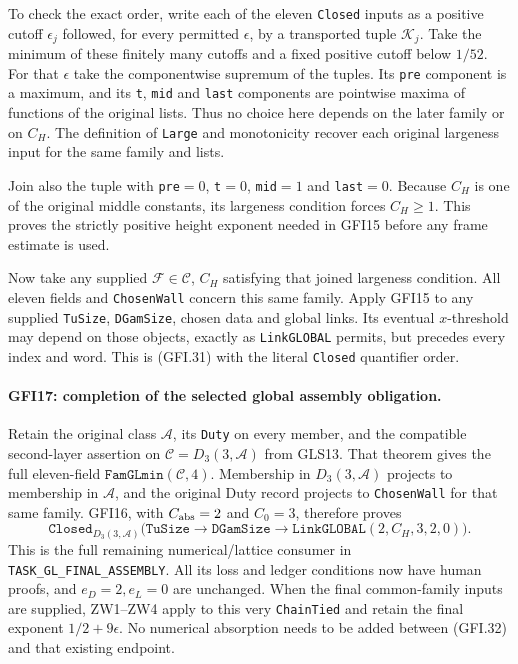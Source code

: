 To check the exact order, write each of the eleven \texttt{Closed}
inputs as a positive cutoff $\epsilon_j$ followed, for every
permitted $\epsilon$, by a transported tuple $\mathcal K_j$.
Take the minimum of these finitely many cutoffs and a fixed
positive cutoff below $1/52$.  For that $\epsilon$ take the
componentwise supremum of the tuples.  Its \texttt{pre} component
is a maximum, and its \texttt{t}, \texttt{mid} and \texttt{last}
components are pointwise maxima of functions of the original lists.
Thus no choice here depends on the later family or on $C_H$.
The definition of \texttt{Large} and monotonicity recover each
original largeness input for the same family and lists.

Join also the tuple with \texttt{pre}$=0$, \texttt{t}$=0$,
\texttt{mid}$=1$ and \texttt{last}$=0$.  Because $C_H$ is one
of the original middle constants, its largeness condition forces
$C_H\ge1$.  This proves the strictly positive height exponent
needed in GFI15 before any frame estimate is used.

Now take any supplied $\mathcal F\in\mathcal C$, $C_H$ satisfying
that joined largeness condition.  All eleven fields and
\texttt{ChosenWall} concern this same family.  Apply GFI15 to
any supplied \texttt{TuSize}, \texttt{DGamSize}, chosen data and
global links.  Its eventual $x$-threshold may depend on those
objects, exactly as \texttt{LinkGLOBAL} permits, but precedes
every index and word.  This is (GFI.31) with the literal
\texttt{Closed} quantifier order.

\paragraph{GFI17: completion of the selected global assembly obligation.}
\label{claim:GFI17}
Retain the original class $\mathcal A$, its \texttt{Duty} on every
member, and the compatible second-layer assertion on
$\mathcal C=D_3(3,\mathcal A)$ from GLS13.  That theorem gives
the full eleven-field $\texttt{FamGLmin}(\mathcal C,4)$.
Membership in $D_3(3,\mathcal A)$ projects to membership in
$\mathcal A$, and the original Duty record projects to
\texttt{ChosenWall} for that same family.  GFI16, with
$C_{\rm abs}=2$ and $C_0=3$, therefore proves
\[
 \boxed{\quad
 \texttt{Closed}_{D_3(3,\mathcal A)}
  \bigl(\texttt{TuSize}\to\texttt{DGamSize}\to
          \texttt{LinkGLOBAL}(2,C_H,3,2,0)\bigr).
 \quad}                                                   \tag{GFI.32}
\]
This is the full remaining numerical/lattice consumer in
\texttt{TASK\_GL\_FINAL\_ASSEMBLY}.  All its loss and ledger
conditions now have human proofs, and $e_D=2,e_L=0$ are unchanged.
When the final common-family inputs are supplied, ZW1--ZW4 apply
to this very \texttt{ChainTied} and retain the final exponent
$1/2+9\epsilon$.  No numerical absorption needs to be added
between (GFI.32) and that existing endpoint.

